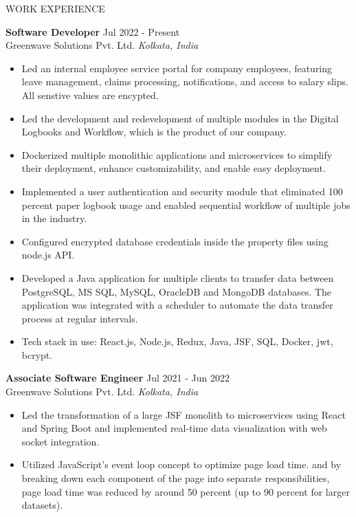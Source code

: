 \documentclass{res} %
\begin{document}
\begin{rSection}{WORK EXPERIENCE}

\textbf{Software Developer} \hfill Jul 2022 - Present\\
Greenwave Solutions Pvt. Ltd. \hfill \textit{Kolkata, India}
 \begin{itemize}
    \itemsep -5pt {} 
    \item Led an internal employee service portal for company employees, featuring leave management, claims processing, notifications, and access to salary slips. All senstive values are encypted.
     \item Led the development and redevelopment of multiple modules in the Digital Logbooks and Workflow, which is the product of our company.
     \item Dockerized multiple monolithic applications and microservices to simplify their deployment, enhance customizability, and enable easy deployment.
     \item Implemented a user authentication and security module that eliminated 100 percent paper logbook usage and enabled sequential workflow of multiple jobs in the industry.
     \item Configured encrypted database credentials inside the property files using node.js API.
     \item Developed a Java application for multiple clients to transfer data between PostgreSQL, 
MS SQL, MySQL, OracleDB and MongoDB databases. The application was integrated with a scheduler to 
automate the data transfer process at regular intervals.

    \item Tech stack in use: React.js, Node.js, Redux, Java, JSF, SQL, Docker, jwt, bcrypt.
 \end{itemize}
 
\textbf{Associate Software Engineer} \hfill Jul 2021 - Jun 2022\\
Greenwave Solutions Pvt. Ltd. \hfill \textit{Kolkata, India}
 \begin{itemize}
    \itemsep -3pt {} 
     \item Led the transformation of a large JSF monolith to microservices using React and Spring Boot
    and implemented real-time data visualization with web socket integration.
\item Utilized JavaScript's event loop concept to optimize page load time.
and by breaking down each component of the page into separate responsibilities, page load time was reduced by around 50 percent (up to 90 percent for larger datasets).


\end{itemize}
\end{rSection}
\end{document}
